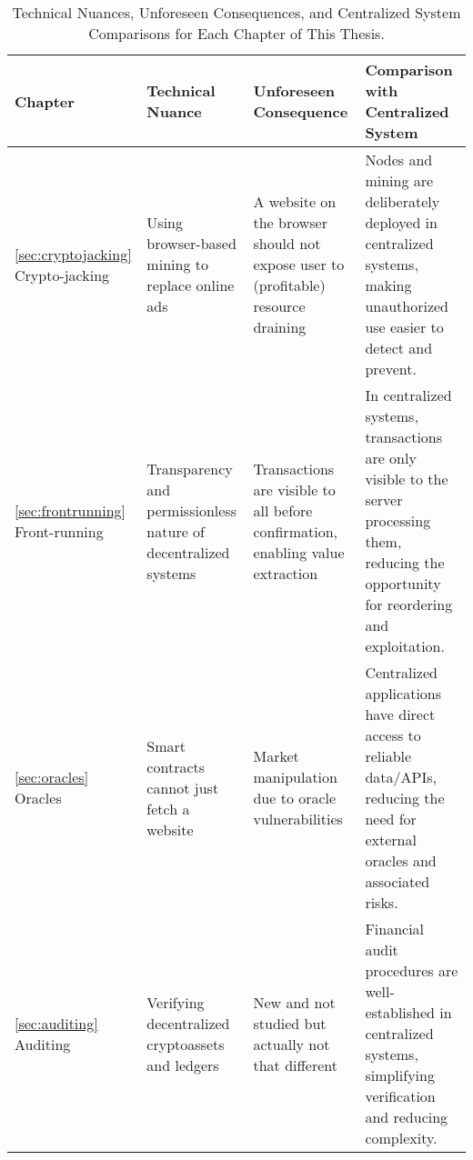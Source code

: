 \begin{table}[t]
    \centering
    \begin{adjustbox}{width=\textwidth}
    \begin{tabular}{|p{3cm}|p{4.75cm}|p{4.75cm}|p{5cm}|}
        \hline
        \rowcolor{lightgray}
        \textbf{Chapter} & \textbf{Technical Nuance} & \textbf{Unforeseen Consequence} & \textbf{Comparison with Centralized System} \\ \hline
        
        \ref{sec:cryptojacking} Crypto-jacking &
        Using browser-based \newline mining  to replace online ads &
        A website on the browser should not expose user to (profitable) resource draining &
        Nodes and mining are deliberately deployed in centralized systems, making unauthorized use easier to detect and prevent. \\ \hline
        
        \ref{sec:frontrunning} Front-running &
        Transparency and \newline permissionless nature of decentralized systems &
        Transactions are visible to all before confirmation, enabling value extraction &
        In centralized systems, transactions are only visible to the server processing them, reducing the opportunity for reordering and exploitation. \\ \hline
        
        \ref{sec:oracles} Oracles &
        Smart contracts cannot just fetch a website &
        Market manipulation due to oracle vulnerabilities &
        Centralized applications have direct access to reliable data/APIs, reducing the need for external oracles and associated risks. \\ \hline
        
        \ref{sec:auditing} Auditing &
        Verifying decentralized cryptoassets and ledgers &
        New and not studied but actually not that different &
        Financial audit procedures are well-established in centralized systems, simplifying verification and reducing complexity. \\ \hline
    \end{tabular}
    \end{adjustbox}
    \caption[Technical Nuances, Unforeseen Consequences, and Centralized System Comparisons]{Technical Nuances, Unforeseen Consequences, and Centralized System Comparisons for Each Chapter of This Thesis.}
    \label{tab:merged_table}
\end{table}



